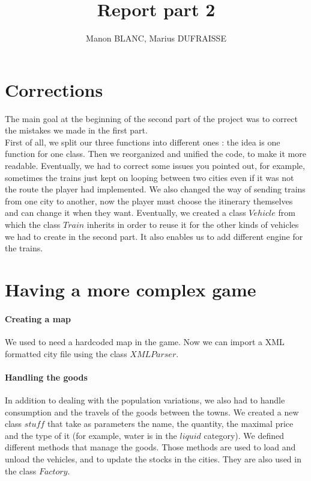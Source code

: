 \documentclass[a4paper]{article}
\title{Report part 2}
\author{Manon BLANC, Marius DUFRAISSE}
\date{  }
\begin{document}
	\maketitle
	\thispagestyle{fancy}

	\section{Corrections}
	The main goal at the beginning of the second part of the project was to correct the mistakes we made in the first part.\\
	First of all, we split our three functions into different ones : the idea is one function for one class. Then we reorganized and unified the code, to make it more readable. Eventually, we had to correct some issues you pointed out, for example, sometimes the trains just kept on looping between two cities even if it was not the route the player had implemented. We also changed the way of sending trains from one city to another, now the player must choose the itinerary themselves and can change it when they want. Eventually, we created a class $Vehicle$ from which the class $Train$ inherits in order to reuse it for the other kinds of vehicles we had to create in the second part. It also enables us to add different engine for the trains.

	\section{Having a more complex game}
	\paragraph{Creating a map}

	We used to need a hardcoded map in the game. Now we can import a XML formatted city file using the class $XMLParser$.

	\paragraph{Handling the goods}

	In addition to dealing with the population variations, we also had to handle consumption and the travels of the goods between the towns. We created a new class $stuff$ that take as parameters the name, the quantity, the maximal price and the type of it (for example, water is in the $liquid$ category). We defined different methods that manage the goods. Those methods are used to load and unload the vehicles, and to update the stocks in the cities. They are also used in the class $Factory$.\\
\end{document}
